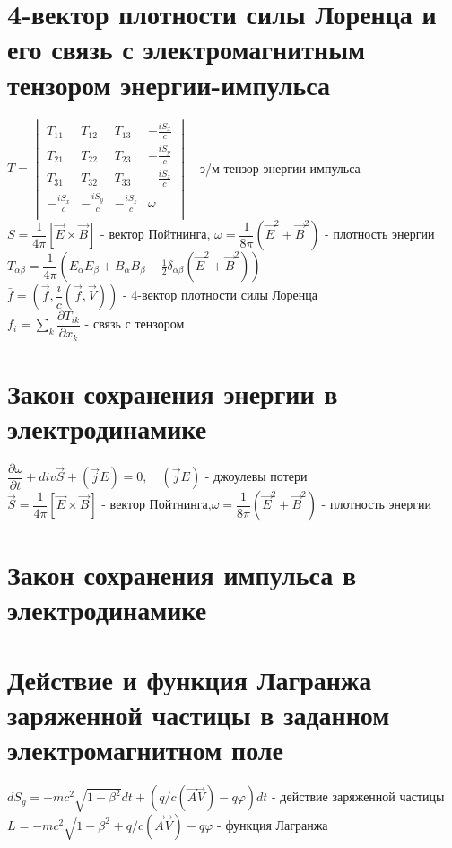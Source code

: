 \begin{multicols*}{2}
		\section{4-вектор плотности силы Лоренца и его связь с электромагнитным тензором энергии-импульса}
		$T = \begin{vmatrix}
			T_{11}& T_{12}& T_{13}& -\frac{iS_x}{c}\\
			T_{21}& T_{22}& T_{23}& -\frac{iS_y}{c}\\
			T_{31}& T_{32}& T_{33}& -\frac{iS_z}{c}\\
			-\frac{iS_x}{c}& -\frac{iS_y}{c}& -\frac{iS_z}{c}& \omega \\
		\end{vmatrix}$ - э/м тензор энергии-импульса\\
		$S = \dfrac{1}{4\pi}\left[\vec{E}\times \vec{B}\right]$ - вектор Пойтнинга, \quad $\omega = \dfrac{1}{8\pi}(\vec{E}^2 + \vec{B}^2)$ - плотность энергии\\
		$T_{\alpha \beta} = \dfrac{1}{4\pi}(E_\alpha E_\beta + B_\alpha B_\beta - \frac{1}{2}\delta_{\alpha \beta}(\vec{E}^2 + \vec{B}^2))$\\
		$\bar{f} = (\vec{f}, \dfrac{i}{c}(\vec{f}, \vec{V}))$ - 4-вектор плотности силы Лоренца\\
		$f_i = \sum_{k}^{} \dfrac{\partial T_{ik}}{\partial x_k}$ - связь с тензором

		\section{Закон сохранения энергии в электродинамике}
		$\dfrac{\partial \omega}{\partial t} + div \vec{S} + (\vec{j}E) = 0, \quad (\vec{j}E)$ - джоулевы потери\\
		$\vec{S} = \dfrac{1}{4\pi}\left[\vec{E}\times \vec{B}\right]$ - вектор Пойтнинга,\quad $\omega = \dfrac{1}{8\pi}(\vec{E}^2 + \vec{B}^2)$ - плотность энергии
		
		\section{Закон сохранения импульса в электродинамике}
		
		\section{Действие и функция Лагранжа заряженной частицы в заданном электромагнитном поле}
		$dS_g = -mc^2\sqrt{1-\beta^2} dt + (q/c(\vec{A}\vec{V}) - q\varphi)dt$ - действие заряженной частицы\\
		$L = -mc^2\sqrt{1-\beta^2} + q/c(\vec{A}\vec{V}) - q\varphi$ - функция Лагранжа
		

\end{multicols*}
